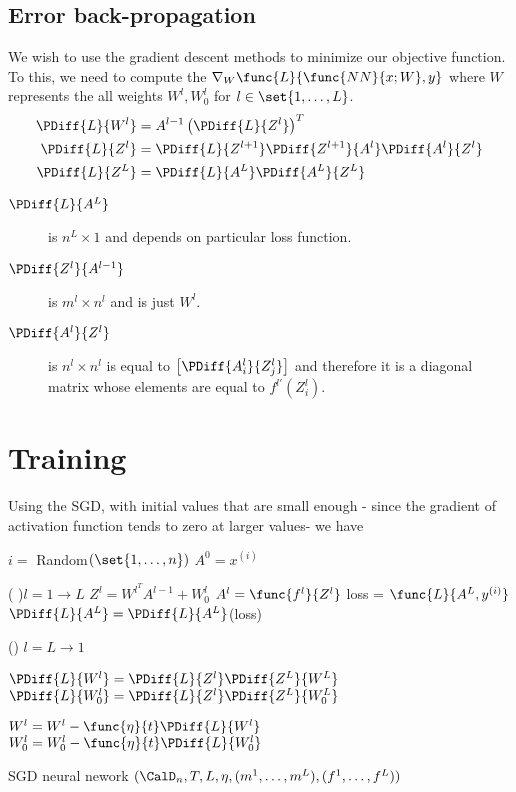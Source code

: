 \subsection{Error back-propagation}
We wish to use the gradient descent methods to minimize our objective function. To this, we need to compute the \(\nabla_W \func{L}{\func{NN}{x ; W},y}\) where \(W\) represents the all weights \(W^l , W^l_0\) for \(l \in \set{1, \dots , L}\).
\begin{align*}
    \PDiff{L}{W^l} &= A^{l - 1} \left(\PDiff{L}{Z^l}\right)^T\\
    \PDiff{L}{Z^l} &= \PDiff{L}{Z^{l+1}} \PDiff{Z^{l+ 1}}{A^l} \PDiff{A^l}{Z^l}\\
    \PDiff{L}{Z^L} &= \PDiff{L}{A^L} \PDiff{A^L}{Z^L}     
\end{align*}

\begin{description}
    \item [\(\PDiff{L}{A^L}\)] is \(n^L \times 1\) and depends on particular loss function.
    \item [\(\PDiff{Z^{l}}{A^{l - 1}}\)] is \(m^l \times n^l\) and is just \(W^l\).
    \item [\(\PDiff{A^l}{Z^l}\)] is \(n^l \times n^l\) is equal to \(\left[\PDiff{A^l_i}{Z^l_j}\right]\) and therefore it is a diagonal matrix whose elements are equal to \(f^{l'}(Z^l_i)\).
\end{description}

\section{Training}
Using the SGD, with initial values that are small enough - since the gradient of activation function tends to zero at larger values- we have

\begin{algorithm}[H]
    \DontPrintSemicolon

    {
        $i = $ Random$(\set{1, \dots ,n })$\;
        $A^0 = x^{(i)} $\;
        
        \For( ){$l = 1 \to L$}{
            $Z^l = W^{l^T}A^{l -1} + W_0^l $\;
            $A^l = \func{f^l}{Z^l} $\;
        }
        loss = $\func{L}{A^L, y^{(i)}}$ \;
        $\PDiff{L}{A^L} = \PDiff{L}{A^L}$(loss)\;
       
        \For() {$l = L \to 1 $}{
            $\PDiff{L}{W^l} = \PDiff{L}{Z^l} \PDiff{Z^L}{W^L}$ \;
            $\PDiff{L}{W_0^l} = \PDiff{L}{Z^l} \PDiff{Z^L}{W_0^L}$ \;

            $W^l = W^l - \func{\eta}{t} \PDiff{L}{W^l} $\;
            $W^l_0 = W^l_0 - \func{\eta}{t} \PDiff{L}{W^l_0} $\;
        }
    }
    \caption{SGD neural nework $(\CalD_n, T , L , \eta , (m^1 , \dots , m^L) , (f^1 , \dots , f^L) )$}
\end{algorithm}